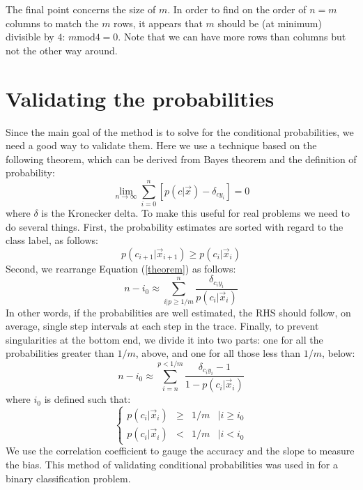 The final point concerns the size of $m$. In order to find on the order
of $n=m$ columns to match the $m$ rows, it appears that $m$ should be 
(at minimum) divisible by $4$: $m \mathrm{mod} 4 = 0$.
Note that we can have more rows than columns but not the other way around.

\section{Validating the probabilities}

Since the main goal of the method 
is to solve for the conditional probabilities, 
we need a good way to validate them. 
Here we use a technique based on the
following theorem, which can be derived from Bayes theorem and the 
definition of probability:
\begin{equation}
	\lim_{n \rightarrow \infty} \sum_{i=0}^n \left [
	p(c | \vec x) - \delta_{cy_i} \right ] = 0
	\label{theorem}
\end{equation}
where $\delta$ is the Kronecker delta.
To make this useful for real problems we need to do several things.
First, the probability estimates are sorted with regard to the class
label, as follows:
\begin{equation}
	p(c_{i+1} | \vec x_{i+1}) \ge p(c_i | \vec x_i)
\end{equation}
Second, we rearrange Equation (\ref{theorem}) as follows:
\begin{equation}
	n - i_0 \approx \sum_{i|p \ge 1/m}^{n} \frac{\delta_{c_i y_i}}{p(c_i | \vec x_i)}
\end{equation}
In other words, if the probabilities are well estimated, the RHS should
follow, on average, single step intervals at each step in the trace.
Finally, to prevent singularities at the bottom end, 
we divide it into two parts:
one for all the probabilities greater than $1/m$, above, and one for all those 
less than $1/m$, below:
\begin{equation}
	n - i_0  \approx \sum_{i=n}^{p < 1/m} \frac{\delta_{c_i y_i} - 1}{1 - p(c_i | \vec x_i)}
\end{equation}
where $i_0$ is defined such that:
\begin{equation}
	\left \lbrace
	\begin{matrix}
		p(c_i | \vec x_i) & \ge & 1/m &| i \ge i_0 \\
		p(c_i | \vec x_i) & < & 1/m & | i < i_0
	\end{matrix}
	\right .
\end{equation}
We use the correlation coefficient to gauge the accuracy and the slope to
measure the bias.
This method of validating conditional probabilities was used in
\citet{Mills2009} for a binary classification problem.


